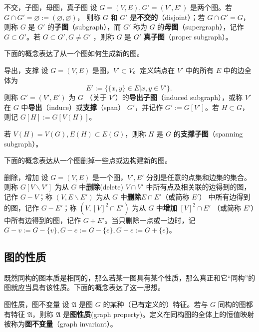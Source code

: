 \begin{definition}{不交，子图，母图，真子图}
设 $G=(V,E),G'=(V',E')$ 是两个图。若 $G\cap G'=\varnothing:=(\varnothing,\varnothing)$， 则称 $G$ 和 $G'$ 是\textbf{不交的}（disjoint）；若 $G\cap G'=G$，则称 $G$ 是 $G'$ 的\textbf{子图}（subgraph），而 $G'$ 称为 $G$ 的\textbf{母图}（supergraph），记作 $G\subset G'$。若 $G\subset G', G\neq G'$ ，则称 $G$ 是 $G'$ \textbf{真子图}（proper subgraph）。
\end{definition}

下面的概念表达了从一个图如何生成新的图。

\begin{definition}{导出，支撑}
设 $G=(V,E)$ 是图，$V'\subset V$。定义端点在 $V'$ 中的所有 $E$ 中的边全体为
\begin{equation}
E':=\{\{x,y\}\in E|x,y\in V'\}.~
\end{equation}
则称 $G'=(V',E')$ 为 $G$ （关于 $V'$）的\textbf{导出子图}（induced subgraph），或称 $V'$ 在 $G$ 中\textbf{导出}（induce）或\textbf{支撑}（span） $G'$，并记作 $G':=G[V']$。若 $H\subset G$，则记 $G[H]:=G[V(H)]$。

若 $V(H)=V(G),E(H)\subset E(G)$，则称 $H$ 是 $G$ 的\textbf{支撑子图}（spanning subgraph）。
\end{definition}
下面的概念表达从一个图删掉一些点或边构建新的图。
\begin{definition}{删除，增加}
设 $G=(V,E)$ 是一个图，$V',E'$ 分别是任意的点集和边集的集合。则称 $G[V\backslash V']$ 为从 $G$ 中\textbf{删除}(delete) $V\cap V'$ 中所有点及相关联的边得到的图，记作 $G-V$；称
 $(V,E\backslash E')$ 为从 $G$ 中\textbf{删除}$E\cap E'$（或简称 $E'$） 中所有边得到的图，记作 $G-E'$；称 $(V,[V]^2\cap E')$ 为从 $G$ 中\textbf{增加} $[V]^2\cap E'$ （或简称 $E'$）中所有边得到的图，记作 $G+E'$。当只删除一点或一边时，记 $G-v:=G-\{v\},G-e:=G-\{e\},G+e:=G+\{e\}$。
\end{definition}





\subsection{图的性质}
既然同构的图本质是相同的，那么若某一图具有某个性质，那么真正和它“同构”的图就应当具有该性质。下面的概念表达了这一思想。
\begin{definition}{图性质，图不变量}
设 $\mathfrak A$ 是图 $G$ 的某种（已有定义的）特征。若与 $G$ 同构的图都有特征 $\mathfrak A$，则称 $\mathfrak A$ 是\textbf{图性质}(graph property)。定义在同构图的全体上的恒值映射被称为\textbf{图不变量}（graph invariant）。
\end{definition}

